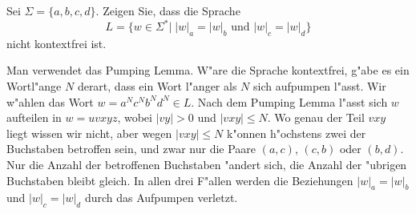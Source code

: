 Sei $\Sigma=\{a,b,c,d\}$.
Zeigen Sie, dass die Sprache
\[
L=\{w\in\Sigma^*|\;\text{$|w|_a=|w|_b$ und $|w|_c=|w|_d$}\}
\]
nicht kontextfrei ist.

\begin{loesung}
Man verwendet das Pumping Lemma. W"are die Sprache kontextfrei, g"abe
es ein Wortl"ange $N$ derart, dass ein Wort l"anger als $N$ sich
aufpumpen l"asst.
Wir w"ahlen das Wort $w=a^Nc^Nb^Nd^N\in L$. Nach dem Pumping
Lemma l"asst sich $w$ aufteilen in
$w = uvxyz$, wobei $|vy|>0$ und $|vxy|\le N$. Wo genau der Teil
$vxy$ liegt wissen wir nicht, aber wegen $|vxy|\le N$ k"onnen
h"ochstens zwei der Buchstaben betroffen sein, und
zwar nur die Paare $(a,c)$, $(c,b)$ oder $(b,d)$. Nur die Anzahl
der betroffenen Buchstaben "andert sich, die Anzahl der "ubrigen
Buchstaben bleibt gleich. In allen drei F"allen werden die
Beziehungen $|w|_a=|w|_b$ und $|w|_c=|w|_d$ durch das Aufpumpen verletzt.
\end{loesung}
